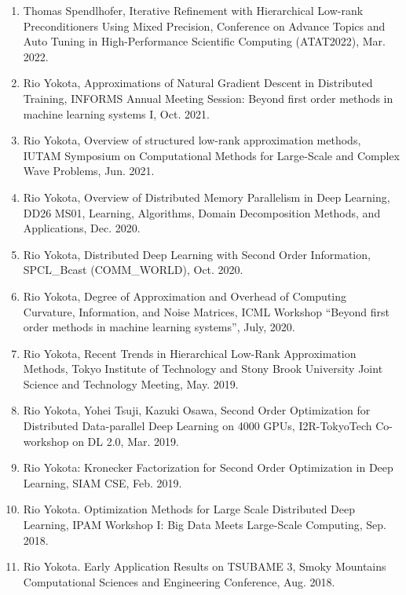 \documentclass[margin,line]{cv}
\begin{document}
\begin{resume}
\begin{enumerate}
\item Thomas Spendlhofer, Iterative Refinement with Hierarchical Low-rank Preconditioners Using Mixed Precision, Conference on Advance Topics and Auto Tuning in High-Performance Scientific Computing (ATAT2022), Mar. 2022.

\item Rio Yokota, Approximations of Natural Gradient Descent in Distributed Training, INFORMS Annual Meeting Session: Beyond first order methods in machine learning systems I, Oct. 2021.

\item Rio Yokota, Overview of structured low-rank approximation methods, IUTAM Symposium on Computational Methods for Large-Scale and Complex Wave Problems, Jun. 2021.

\item Rio Yokota, Overview of Distributed Memory Parallelism in Deep Learning, DD26 MS01, Learning, Algorithms, Domain Decomposition Methods, and Applications, Dec. 2020.

\item Rio Yokota, Distributed Deep Learning with Second Order Information, SPCL\_Bcast (COMM\_WORLD), Oct. 2020.

\item Rio Yokota, Degree of Approximation and Overhead of Computing Curvature, Information, and Noise Matrices, ICML Workshop “Beyond first order methods in machine learning systems”, July, 2020.

\item Rio Yokota, Recent Trends in Hierarchical Low-Rank Approximation Methods, Tokyo Institute of Technology and Stony Brook University Joint Science and Technology Meeting, May. 2019.

\item Rio Yokota, Yohei Tsuji, Kazuki Osawa, Second Order Optimization for Distributed Data-parallel Deep Learning on 4000 GPUs, I2R-TokyoTech Co-workshop on DL 2.0, Mar. 2019.

\item Rio Yokota: Kronecker Factorization for Second Order Optimization in Deep Learning, SIAM CSE, Feb. 2019.

\item Rio Yokota. Optimization Methods for Large Scale Distributed Deep Learning, IPAM Workshop I: Big Data Meets Large-Scale Computing, Sep. 2018.

\item Rio Yokota. Early Application Results on TSUBAME 3, Smoky Mountains Computational Sciences and Engineering Conference, Aug. 2018.


\end{enumerate}
\end{resume}
\end{document}
